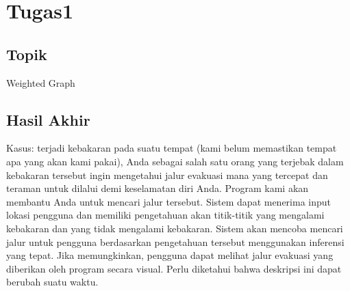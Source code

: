 \documentclass{article}
\begin{document}
\section*{Tugas1}
\subsection{Topik}
Weighted Graph
\subsection{Hasil Akhir}
Kasus: terjadi kebakaran pada suatu tempat (kami belum memastikan 
tempat apa yang akan kami pakai), Anda sebagai salah satu orang 
yang terjebak dalam kebakaran tersebut ingin mengetahui jalur 
evakuasi mana yang tercepat dan teraman untuk dilalui demi keselamatan
diri Anda. Program kami akan membantu Anda untuk mencari jalur tersebut.
Sistem dapat menerima input lokasi pengguna dan memiliki pengetahuan
akan titik-titik yang mengalami kebakaran dan yang tidak mengalami kebakaran.
Sistem akan mencoba mencari jalur untuk pengguna berdasarkan pengetahuan tersebut
menggunakan inferensi yang tepat. Jika memungkinkan, pengguna dapat melihat 
jalur evakuasi yang diberikan oleh program secara visual.
Perlu diketahui bahwa deskripsi ini dapat berubah suatu waktu.


\vfill
\end{document}
